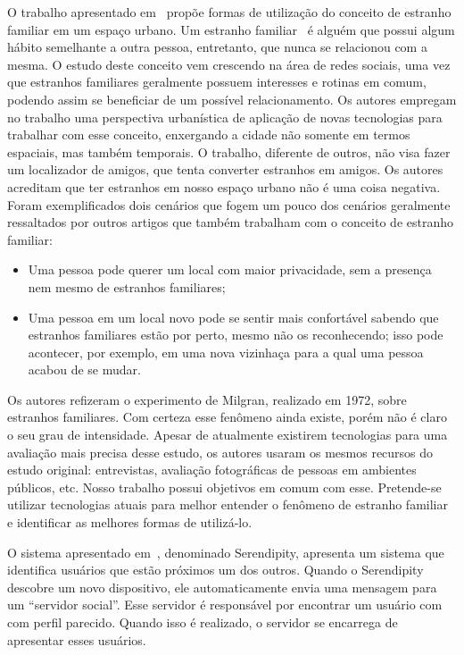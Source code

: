 O trabalho apresentado em~\cite{FamiliarStranger} propõe formas de
utilização do conceito de
estranho familiar em um espaço urbano. Um estranho
familiar~\cite{FamiliarStranger} é alguém que possui algum hábito
semelhante a outra pessoa, entretanto, que nunca se relacionou com a
mesma. O estudo deste conceito vem crescendo na área de redes sociais,
uma vez que estranhos
familiares geralmente possuem interesses e rotinas em comum, podendo
assim se beneficiar de um possível relacionamento. Os autores empregam
no trabalho
uma perspectiva urbanística de aplicação de novas tecnologias para
trabalhar com esse conceito, enxergando a cidade não somente em termos
espaciais, mas também temporais. O trabalho, diferente de outros, não
visa fazer um localizador de amigos, que tenta converter estranhos em
amigos. Os autores acreditam que ter estranhos em nosso espaço urbano
não é uma coisa negativa. Foram exemplificados dois cenários que fogem
um
pouco dos cenários geralmente ressaltados por outros artigos que também
trabalham com o conceito de estranho familiar:
\begin{itemize}
    \item Uma pessoa pode querer um local com maior privacidade, sem a presença nem mesmo de estranhos familiares;
    \item Uma  pessoa em um local novo pode se sentir mais confortável
    sabendo que estranhos familiares estão por  perto, mesmo não os
    reconhecendo; isso pode acontecer, por exemplo, em uma nova
    vizinhaça para a  qual uma pessoa acabou de se mudar.
\end{itemize}
Os autores refizeram o
experimento de Milgran, realizado em 1972, sobre estranhos familiares.
Com certeza esse fenômeno ainda existe, porém não é claro o seu grau de
intensidade. Apesar de atualmente existirem tecnologias para uma
avaliação mais precisa desse estudo, os autores usaram os mesmos
recursos do estudo original: entrevistas, avaliação fotográficas de
pessoas em ambientes públicos, etc. Nosso trabalho possui objetivos em
comum com esse. Pretende-se utilizar tecnologias atuais para melhor
entender
o fenômeno de estranho familiar e identificar as melhores formas de
utilizá-lo.

O sistema apresentado em~\cite{SocialSerendipity}, denominado
Serendipity,  apresenta um sistema que
identifica usuários que estão próximos um dos outros. Quando o
Serendipity descobre um novo dispositivo, ele automaticamente envia uma
mensagem para um ``servidor social''. Esse servidor é responsável por
encontrar um usuário com com perfil parecido. Quando isso é realizado, o
servidor se encarrega de apresentar esses usuários.

